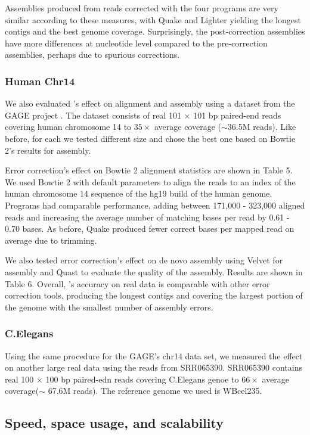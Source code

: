 \documentclass{bmcart}
\begin{document}
Assemblies produced from reads corrected with the four programs are very similar according to these measures, with Quake and Lighter yielding the longest contigs and the best genome coverage. Surprisingly, the post-correction assemblies have more differences at nucleotide level compared to the pre-correction assemblies, perhaps due to spurious corrections.

\subsubsection*{Human Chr14}
We also evaluated \tool's effect on alignment and assembly using a dataset from the GAGE project \cite{salzberg2012gage}.  The dataset consists of real 101 $\times$ 101 bp paired-end reads covering human chromosome 14 to $35\times$ average coverage ($\sim$36.5M reads).  Like before, for each \tool we tested different \kmer size and chose the best one based on Bowtie 2's results for assembly.

Error correction's effect on Bowtie 2 alignment statistics are shown in Table 5.  We used Bowtie 2 with default parameters to align the reads to an index of the human chromosome 14 sequence of the hg19 build of the human genome.  Programs had comparable performance, adding between 171,000 - 323,000 aligned reads and increasing the average number of matching bases per read by 0.61 - 0.70 bases. As before, Quake produced fewer correct bases per mapped read on average due to trimming.   



We also tested error correction's effect on de novo assembly using Velvet for assembly and Quast to evaluate the quality of the assembly.  Results are shown in Table 6.  Overall, \tool's accuracy on real data is comparable with other error correction tools, producing the longest contigs and covering the largest portion of the genome with the smallest number of assembly errors.   

\subsubsection*{C.Elegans} %
Using the same procedure for the GAGE's chr14 data set, we measured the effect on another large real data using the reads from SRR065390. SRR065390 contains real 100 $\times$ 100 bp paired-edn reads covering C.Elegans genoe to $66\times$ average coverage($\sim$ 67.6M reads). The reference genome we used is WBcel235. 

\subsection*{Speed, space usage, and scalability}
\end{document}
